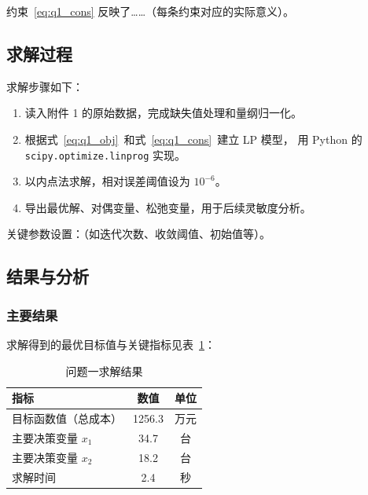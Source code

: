 约束~\eqref{eq:q1_cons} 反映了……（每条约束对应的实际意义）。

\subsection{求解过程}

求解步骤如下：

\begin{enumerate}
  \item 读入附件 1 的原始数据，完成缺失值处理和量纲归一化。
  \item 根据式~\eqref{eq:q1_obj}~和式~\eqref{eq:q1_cons}~建立 LP 模型，
        用 Python 的 \texttt{scipy.optimize.linprog} 实现。
  \item 以内点法求解，相对误差阈值设为 $10^{-6}$。
  \item 导出最优解、对偶变量、松弛变量，用于后续灵敏度分析。
\end{enumerate}

关键参数设置：（如迭代次数、收敛阈值、初始值等）。

\subsection{结果与分析}

\subsubsection{主要结果}

求解得到的最优目标值与关键指标见表~\ref{tab:q1_result}：

\begin{table}[htbp]
  \centering
  \caption{问题一求解结果}
  \label{tab:q1_result}
  \begin{tabular}{lcc}
    \toprule
    \textbf{指标} & \textbf{数值} & \textbf{单位} \\
    \midrule
    目标函数值（总成本）   & 1256.3 & 万元 \\
    主要决策变量 $x_1$     & 34.7   & 台 \\
    主要决策变量 $x_2$     & 18.2   & 台 \\
    求解时间               & 2.4    & 秒 \\
    \bottomrule
  \end{tabular}
\end{table}

